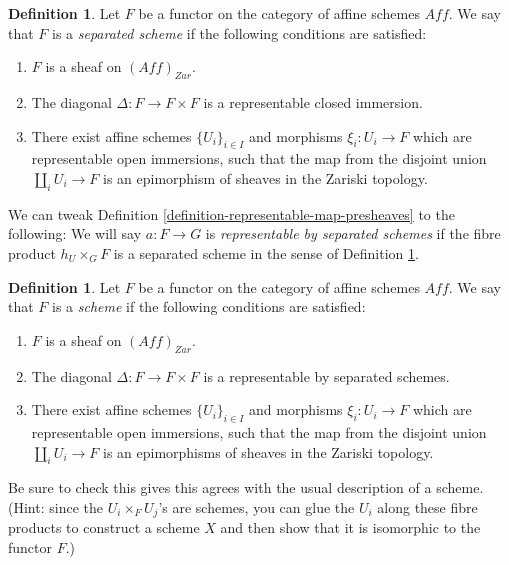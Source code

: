 \documentclass[11pt]{amsart}
\theoremstyle{definition}
\newtheorem{definition}[theorem]{Definition}
\begin{document}
\begin{definition}
	\label{definition-separated-scheme-functor}
	Let $F$ be a functor on the category of affine schemes $\mathit{Aff}$. We say that $F$ is a \textit{separated scheme} if the following conditions are satisfied:
	\begin{enumerate}
		\item $F$ is a sheaf on $(\mathit{Aff})_{\textit{Zar}}$.
		\item The diagonal $\Delta: F\rightarrow F\times F$ is a representable closed immersion.
		\item There exist affine schemes $\{U_i\}_{i\in I}$ and morphisms $\xi_i: U_i\rightarrow F$ which are representable open immersions, such that the map from the disjoint union $\amalg_i U_i\rightarrow F$ is an epimorphism of sheaves in the Zariski topology.
	\end{enumerate}
\end{definition}

We can tweak Definition \ref{definition-representable-map-presheaves} to the following: We will say $a: F\rightarrow G$ is \textit{representable by separated schemes} if the fibre product $h_U\times_G F$ is a separated scheme in the sense of Definition \ref{definition-separated-scheme-functor}.

\begin{definition}
	\label{definition-scheme-functor}
		Let $F$ be a functor on the category of affine schemes $\mathit{Aff}$. We say that $F$ is a \textit{scheme} if the following conditions are satisfied:
	\begin{enumerate}
		\item $F$ is a sheaf on $(\mathit{Aff})_{\textit{Zar}}$.
		\item The diagonal $\Delta: F\rightarrow F\times F$ is a representable by separated schemes.
		\item There exist affine schemes $\{U_i\}_{i\in I}$ and morphisms $\xi_i: U_i\rightarrow F$ which are representable open immersions, such that the map from the disjoint union $\amalg_i U_i\rightarrow F$ is an epimorphisms of sheaves in the Zariski topology.
	\end{enumerate}
\end{definition}

Be sure to check this gives this agrees with the usual description of a scheme. (Hint: since the $U_i\times_F U_j$'s are schemes, you can glue the $U_i$ along these fibre products to construct a scheme $X$ and then show that it is isomorphic to the functor $F$.)
\end{document}
